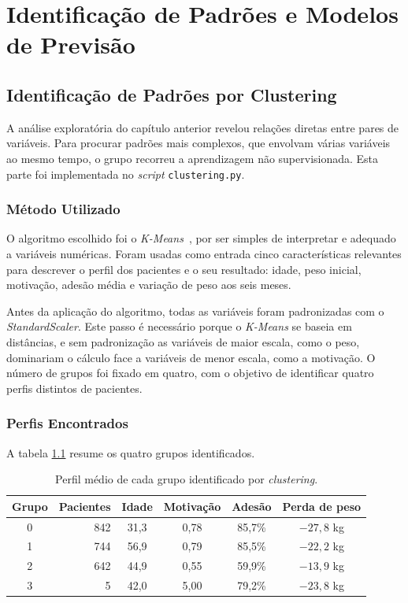 \chapter{Identificação de Padrões e Modelos de Previsão}
\label{chap:modelos}

\section{Identificação de Padrões por Clustering}
A análise exploratória do capítulo anterior revelou relações diretas entre pares de variáveis. Para procurar padrões mais complexos, que envolvam várias variáveis ao mesmo tempo, o grupo recorreu a aprendizagem não supervisionada. Esta parte foi implementada no \textit{script} \texttt{clustering.py}.

\subsection{Método Utilizado}
O algoritmo escolhido foi o \textit{K-Means}~\cite{geron}, por ser simples de interpretar e adequado a variáveis numéricas. Foram usadas como entrada cinco características relevantes para descrever o perfil dos pacientes e o seu resultado: idade, peso inicial, motivação, adesão média e variação de peso aos seis meses.

Antes da aplicação do algoritmo, todas as variáveis foram padronizadas com o \textit{StandardScaler}. Este passo é necessário porque o \textit{K-Means} se baseia em distâncias, e sem padronização as variáveis de maior escala, como o peso, dominariam o cálculo face a variáveis de menor escala, como a motivação. O número de grupos foi fixado em quatro, com o objetivo de identificar quatro perfis distintos de pacientes.

\subsection{Perfis Encontrados}
A tabela \ref{tab:clusters} resume os quatro grupos identificados.

\begin{table}[h]
\centering
\begin{tabular}{|c|r|c|c|c|c|}
\hline
\textbf{Grupo} & \textbf{Pacientes} & \textbf{Idade} & \textbf{Motivação} & \textbf{Adesão} & \textbf{Perda de peso} \\
\hline
0 & 842 & 31,3 & 0,78 & 85,7\% & $-27,8$ kg \\
1 & 744 & 56,9 & 0,79 & 85,5\% & $-22,2$ kg \\
2 & 642 & 44,9 & 0,55 & 59,9\% & $-13,9$ kg \\
3 & 5 & 42,0 & 5,00 & 79,2\% & $-23,8$ kg \\
\hline
\end{tabular}
\caption{Perfil médio de cada grupo identificado por \textit{clustering}.}
\label{tab:clusters}
\end{table}

